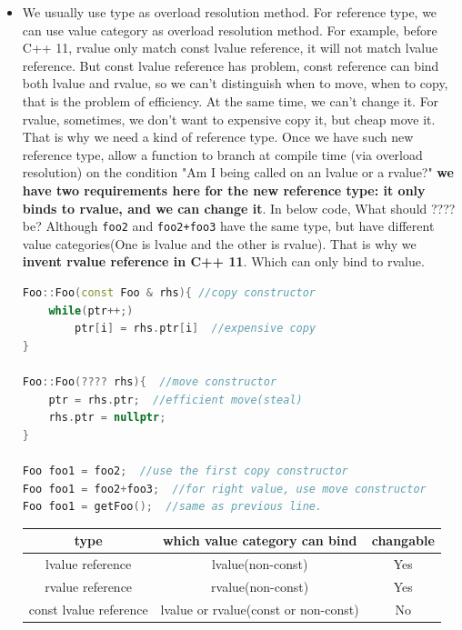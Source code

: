 \documentclass[a4paper,11pt,twoside]{book}
\newcommand{\tophline}{\hline }
\newcommand{\bottomhline}{\\ \hline }
\newcommand{\tophline}{ }
\newcommand{\bottomhline}{ }
\begin{document}
\begin{itemize}
	
	\item We usually use type as overload resolution method. For reference type, we can use value category as overload resolution method. For example, before C++ 11, rvalue only match const lvalue reference, it will not match lvalue reference. But const lvalue reference has problem, const reference can bind both lvalue and rvalue, so we can't distinguish when to move, when to copy, that is the problem of efficiency. At the same time, we can't change it. For rvalue, sometimes, we don't want to expensive copy it, but cheap move it. That is why we need a kind of reference type. Once we have such new reference type,  allow a function to branch at compile time (via overload resolution) on the condition "Am I being called on an lvalue or a rvalue?" \textbf{ we have two requirements here for the new reference type: it only binds to rvalue, and we can change it}. In below code, What should ???? be? Although \texttt{foo2} and \texttt{foo2+foo3} have the same type, but have different value categories(One is lvalue and the other is rvalue). That is why we \textbf{invent rvalue reference in C++ 11}. Which can only bind to rvalue. 

\begin{lstlisting}[frame=single, language=c++]
Foo::Foo(const Foo & rhs){ //copy constructor
	while(ptr++;)
	    ptr[i] = rhs.ptr[i]  //expensive copy
}	

Foo::Foo(???? rhs){  //move constructor
	ptr = rhs.ptr;  //efficient move(steal)
	rhs.ptr = nullptr;
}	
	
Foo foo1 = foo2;  //use the first copy constructor
Foo foo1 = foo2+foo3;  //for right value, use move constructor
Foo foo1 = getFoo();  //same as previous line.
\end{lstlisting}

\begin{center}
		\begin{tabular}{|c|c|c|}
			\tophline 
			type & which value category can bind & changable \\
			\tophline 
			lvalue reference & lvalue(non-const)  &  Yes  \\
			\tophline  
			rvalue reference &  rvalue(non-const)&  Yes \\
			\tophline 
			const lvalue reference & lvalue or rvalue(const or non-const) & No  \bottomhline 
		\end{tabular} 
\end{center}


\end{itemize}
\end{document}
